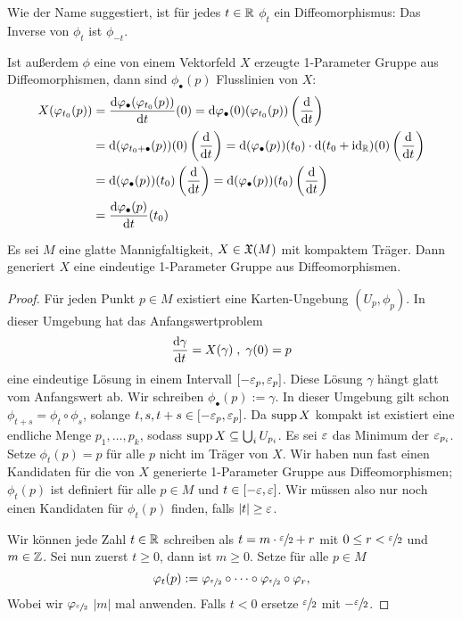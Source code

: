 \begin{remark}
    Wie der Name suggestiert, ist für jedes $t \in { \mathbb R }$ $\phi_t$ ein 
    Diffeomorphismus: Das Inverse von $\phi_t$ ist $\phi_{-t}$.

    Ist außerdem $\phi$ eine von einem Vektorfeld $X$ erzeugte 1-Parameter Gruppe aus 
    Diffeomorphismen, dann sind $\phi_{\bullet}(p)$ Flusslinien von $X$:
    \begin{align*}
        X(\varphi_{t_0}(p)) 
        & = \derive[\varphi_{\bullet}(\varphi_{t_0}(p))]{t}(0)
        = \opd \varphi_{\bullet} (0) (\varphi_{t_0}(p)) \left(\derive{t}\right) \\
        & = \opd (\varphi_{t_0 + \bullet}(p)) (0) \left(\derive{t}\right)
        = \opd (\varphi_{\bullet}(p)) (t_0) \cdot \opd (t_0 + \id_{\R}) (0) \left(\derive{t}\right) \\
        & = \opd (\varphi_{\bullet}(p)) (t_0) \left(\derive{t}\right)
        = \opd (\varphi_{\bullet}(p)) (t_0) \left(\derive{t}\right) \\
        & = \derive[\varphi_{\bullet}(p)]{t}(t_0)
    \end{align*}
\end{remark}

\begin{prop}
    \label{prop: kompaktes VF generiert 1-param. grp.}
    Es sei $M$ eine glatte Mannigfaltigkeit, $X \in { \mathfrak{X} } (M)$ mit kompaktem Träger. Dann 
    generiert $X$ eine eindeutige 1-Parameter Gruppe aus Diffeomorphismen.
\end{prop}

\begin{proof}
    Für jeden Punkt $p \in M$ existiert eine Karten-Ungebung $(U_p, \phi_p)$. In dieser
    Umgebung hat das Anfangswertproblem
    \[ \derive[\gamma]{t} = X (\gamma) \; , \; \gamma(0) = p \]
    eine eindeutige Lösung in einem Intervall $[-\varepsilon_p, \varepsilon_p]$. Diese Lösung 
    $\gamma$ hängt glatt vom Anfangswert ab. Wir schreiben
    $\phi_{\bullet}(p) := \gamma$. In dieser Umgebung gilt schon \\ 
    $\phi_{t + s} = \phi_t \circ \phi_s$, solange $t, s, t + s \in [-\varepsilon_p, \varepsilon_p]$. 
    Da ${ \operatorname{supp} } \, X$ kompakt ist existiert eine endliche Menge ${p_1, \dots, p_k}$, 
    sodass ${ \operatorname{supp} } \, X \subseteq \bigcup_i U_{p_i}$. Es sei $\varepsilon$ das Minimum der 
    $\varepsilon_{p_i}$. Setze $\phi_t(p) = p$ für alle $p$ nicht im Träger von $X$. Wir haben nun 
    fast einen Kandidaten für die von $X$ generierte 1-Parameter Gruppe aus Diffeomorphismen;
    $\phi_t(p)$ ist definiert für alle $p \in M$ und $t \in [-\varepsilon, \varepsilon]$. Wir müssen also nur 
    noch einen Kandidaten für $\phi_t(p)$ finden, falls $|t| \geq \varepsilon$.

    Wir können jede Zahl $t \in { \mathbb R }$ schreiben als $t = m \cdot \sfrac{\varepsilon}{2} + r$ mit 
    $0 \leq r < \sfrac{\varepsilon}{2}$ und $m \in { \mathbb Z }$. Sei nun zuerst $t \geq 0$, dann ist $m \geq 0$.
    Setze für alle $p \in M$ 
    \[ \varphi_t(p) 
        := \varphi_{\sfrac{\varepsilon}{2}} \circ \dots \circ \varphi_{\sfrac{\varepsilon}{2}} \circ \varphi_r , \] 
    Wobei wir $\varphi_{\sfrac{\varepsilon}{2}}$ $|m|$ mal anwenden. Falls $t < 0$ ersetze $\sfrac{\varepsilon}{2}$
    mit $- \sfrac{\varepsilon}{2}$. 
\end{proof}

